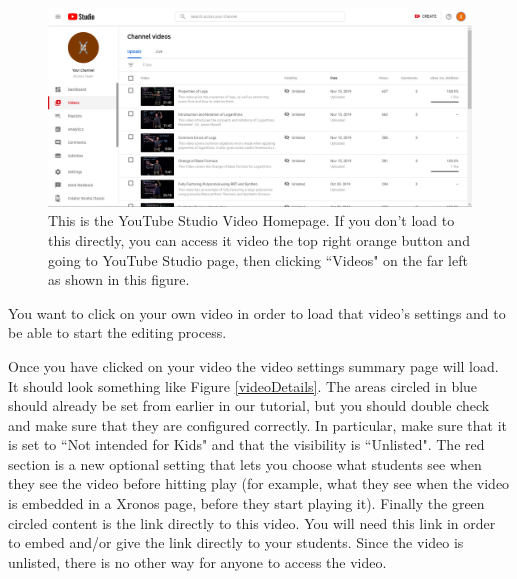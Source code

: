\documentclass{article}
\begin{document}
        \begin{figure}[h]
            \includegraphics[width=\textwidth]{studioHomePage.png}
            \caption{This is the YouTube Studio Video Homepage. If you don't load to this directly, you can access it video the top right orange button and going to YouTube Studio page, then clicking ``Videos" on the far left as shown in this figure.}
            \label{studioHome}
        \end{figure}
        
        You want to click on your own video in order to load that video's settings and to be able to start the editing process.
        
        \newpage
        
        Once you have clicked on your video the video settings summary page will load. It should look something like Figure \ref{videoDetails}. The areas circled in blue should already be set from earlier in our tutorial, but you should double check and make sure that they are configured correctly. In particular, make sure that it is set to ``Not intended for Kids" and that the visibility is ``Unlisted". The red section is a new optional setting that lets you choose what students see when they see the video before hitting play (for example, what they see when the video is embedded in a Xronos page, before they start playing it). Finally the green circled content is the link directly to this video. You will need this link in order to embed and/or give the link directly to your students. Since the video is unlisted, there is no other way for anyone to access the video.
        
\end{document}
